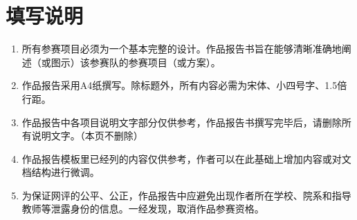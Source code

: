 \chapter*{填写说明}
\begin{enumerate}[label=\arabic*.]
\item 所有参赛项目必须为一个基本完整的设计。作品报告书旨在能够清晰准确地阐述（或图示）该参赛队的参赛项目（或方案）。
\item 作品报告采用A4纸撰写。除标题外，所有内容必需为宋体、小四号字、1.5倍行距。
\item 作品报告中各项目说明文字部分仅供参考，作品报告书撰写完毕后，请删除所有说明文字。（本页不删除）
\item 作品报告模板里已经列的内容仅供参考，作者可以在此基础上增加内容或对文档结构进行微调。
\item 为保证网评的公平、公正，作品报告中应避免出现作者所在学校、院系和指导教师等泄露身份的信息。一经发现，取消作品参赛资格。
\end{enumerate}
\clearpage
